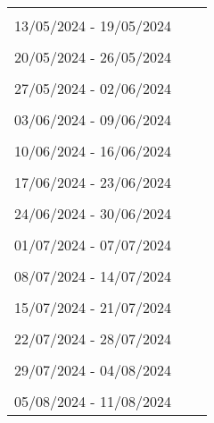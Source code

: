 \begin{table} [htb]
\centering
\begin{tabular}{p{10cm}c r} \\
\hline \\ 
 13/05/2024 - 19/05/2024\\ 
\hline \\ 
 20/05/2024 - 26/05/2024\\ 
\hline \\ 
 27/05/2024 - 02/06/2024\\ 
\hline \\ 
 03/06/2024 - 09/06/2024\\ 
\hline \\ 
 10/06/2024 - 16/06/2024\\ 
\hline \\ 
 17/06/2024 - 23/06/2024\\ 
\hline \\ 
 24/06/2024 - 30/06/2024\\ 
\hline \\ 
 01/07/2024 - 07/07/2024\\ 
\hline \\ 
 08/07/2024 - 14/07/2024\\ 
\hline \\ 
 15/07/2024 - 21/07/2024\\ 
\hline \\ 
 22/07/2024 - 28/07/2024\\ 
\hline \\ 
 29/07/2024 - 04/08/2024\\ 
\hline \\ 
 05/08/2024 - 11/08/2024\\ 

\end{tabular}
\end{table}
